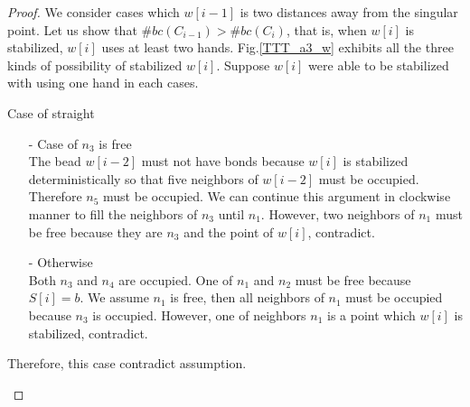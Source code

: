 

\begin{proof}
We consider cases which $w[i-1]$ is two distances away from the singular point.
Let us show that $\#bc(C_{i-1}) > \#bc(C_i)$, that is, when $w[i]$ is stabilized, $w[i]$ uses at least two hands.
Fig.\ref{TTT_a3_w} exhibits all the three kinds of possibility of stabilized $w[i]$.
Suppose $w[i]$ were able to be stabilized with using one hand in each cases.


\begin{paragraph}{Case of straight}
\begin{itemize}
\item[-] Case of $n_3$ is free\\
The bead $w[i-2]$ must not have bonds because $w[i]$ is stabilized deterministically so that five neighbors of $w[i-2]$ must be occupied.
Therefore $n_5$ must be occupied.
We can continue this argument in clockwise manner to fill the neighbors of $n_3$ until $n_1$.
However, two neighbors of $n_1$ must be free because they are $n_3$ and the point of $w[i]$, contradict.

\item[-] Otherwise\\
Both $n_3$ and $n_4$ are occupied.
One of $n_1$ and $n_2$ must be free because $S[i] = b$.
We assume $n_1$ is free, then all neighbors of $n_1$ must be occupied because $n_3$ is occupied.
However, one of neighbors $n_1$ is a point which $w[i]$ is stabilized, contradict.
\end{itemize}

Therefore, this case contradict assumption.
\end{paragraph}


\end{proof}
